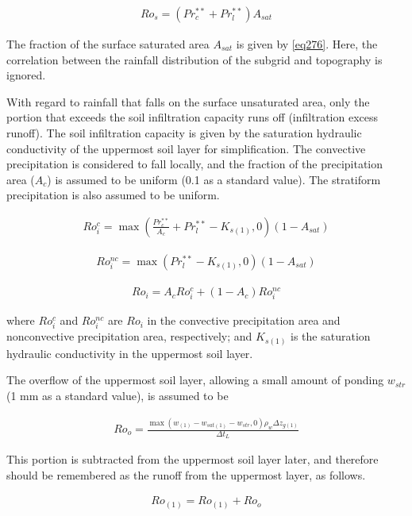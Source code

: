 \begin{eqnarray}
Ro_s = (Pr_c^{\ast\ast} + Pr_l^{\ast\ast}) A_{sat}
\label{eq283}
\end{eqnarray}

The fraction of the surface saturated area \(A_{sat}\) is given by \ref{eq276}. Here, the correlation between the rainfall distribution of the subgrid and topography is ignored.

With regard to rainfall that falls on the surface unsaturated area, only the portion that exceeds the soil infiltration capacity runs off (infiltration excess runoff). The soil infiltration capacity
is given by the saturation hydraulic conductivity of the uppermost soil layer for simplification. The convective precipitation is considered to fall locally, and the fraction of the precipitation area
(\(A_c\)) is assumed to be uniform (0.1 as a standard value). The stratiform precipitation is also assumed to be uniform.

\begin{eqnarray}
Ro_i^c = \max( \frac{Pr_c^{**}}{A_c} + Pr_l^{**} - K_{s(1)}, 0 ) (1 - A_{sat})
 \label{eq284}
\end{eqnarray}

\begin{eqnarray}
Ro_i^{nc} = \max( Pr_l^{\ast\ast} - K_{s(1)}, 0 ) (1 - A_{sat})
 \label{eq285}
\end{eqnarray}

\begin{eqnarray}
Ro_i = A_c Ro_i^c + ( 1 - A_c ) Ro_i^{nc}
 \label{eq286}
\end{eqnarray}

where \(Ro_i^c\) and \(Ro_i^{nc}\) are \(Ro_i\) in the convective precipitation area and nonconvective precipitation area, respectively; and \(K_{s(1)}\) is the saturation hydraulic conductivity in
the uppermost soil layer.

The overflow of the uppermost soil layer, allowing a small amount of ponding \(w_{str}\) (1 mm as a standard value), is assumed to be

\begin{eqnarray}
Ro_o = \frac{\max(w_{(1)} - w_{sat(1)} - w_{str}, 0) \rho_w \Delta z_{g(1)}}{\Delta t_L}
 \label{eq287}
\end{eqnarray}

This portion is subtracted from the uppermost soil layer later, and therefore should be remembered as the runoff from the uppermost layer, as follows.

\begin{eqnarray}
Ro_{(1)} = Ro_{(1)} + Ro_o
 \label{eq288}
\end{eqnarray}

